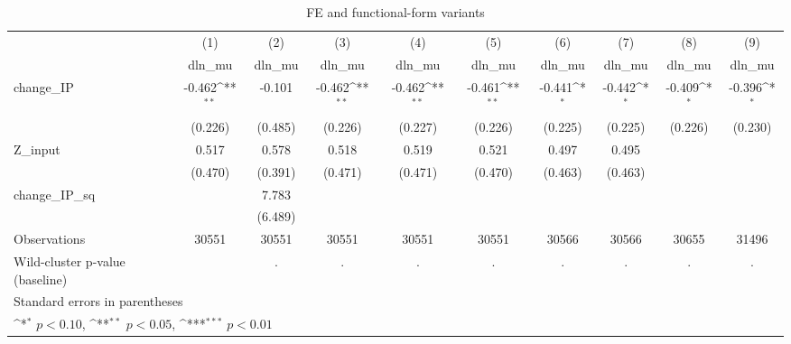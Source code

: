 \begin{table}[htbp]\centering
\def\sym#1{\ifmmode^{#1}\else\(^{#1}\)\fi}
\caption{FE and functional-form variants}
\begin{tabular}{l*{9}{c}}
\hline\hline
            &\multicolumn{1}{c}{(1)}&\multicolumn{1}{c}{(2)}&\multicolumn{1}{c}{(3)}&\multicolumn{1}{c}{(4)}&\multicolumn{1}{c}{(5)}&\multicolumn{1}{c}{(6)}&\multicolumn{1}{c}{(7)}&\multicolumn{1}{c}{(8)}&\multicolumn{1}{c}{(9)}\\
            &\multicolumn{1}{c}{dln\_mu}&\multicolumn{1}{c}{dln\_mu}&\multicolumn{1}{c}{dln\_mu}&\multicolumn{1}{c}{dln\_mu}&\multicolumn{1}{c}{dln\_mu}&\multicolumn{1}{c}{dln\_mu}&\multicolumn{1}{c}{dln\_mu}&\multicolumn{1}{c}{dln\_mu}&\multicolumn{1}{c}{dln\_mu}\\
\hline
change\_IP   &      -0.462\sym{**} &      -0.101         &      -0.462\sym{**} &      -0.462\sym{**} &      -0.461\sym{**} &      -0.441\sym{*}  &      -0.442\sym{*}  &      -0.409\sym{*}  &      -0.396\sym{*}  \\
            &     (0.226)         &     (0.485)         &     (0.226)         &     (0.227)         &     (0.226)         &     (0.225)         &     (0.225)         &     (0.226)         &     (0.230)         \\
[1em]
Z\_input     &       0.517         &       0.578         &       0.518         &       0.519         &       0.521         &       0.497         &       0.495         &                     &                     \\
            &     (0.470)         &     (0.391)         &     (0.471)         &     (0.471)         &     (0.470)         &     (0.463)         &     (0.463)         &                     &                     \\
[1em]
change\_IP\_sq&                     &       7.783         &                     &                     &                     &                     &                     &                     &                     \\
            &                     &     (6.489)         &                     &                     &                     &                     &                     &                     &                     \\
\hline
Observations&       30551         &       30551         &       30551         &       30551         &       30551         &       30566         &       30566         &       30655         &       31496         \\
Wild-cluster p-value (baseline)&                     &           .         &           .         &           .         &           .         &           .         &           .         &           .         &           .         \\
\hline\hline
\multicolumn{10}{l}{\footnotesize Standard errors in parentheses}\\
\multicolumn{10}{l}{\footnotesize \sym{*} \(p<0.10\), \sym{**} \(p<0.05\), \sym{***} \(p<0.01\)}\\
\end{tabular}
\end{table}
